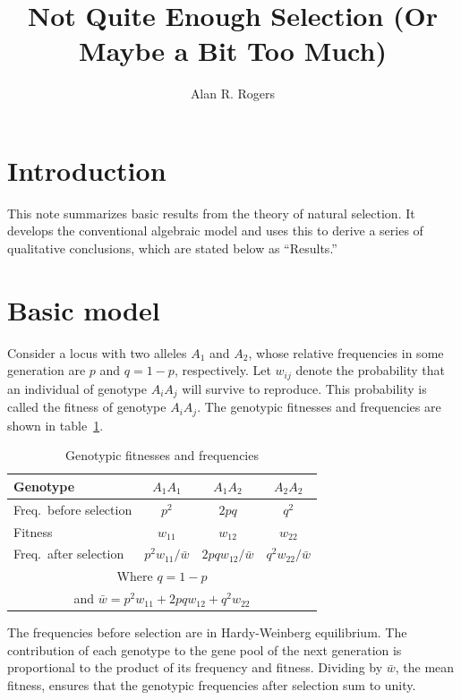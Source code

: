 \documentclass[11pt]{article}
\begin{document}
\title{Not Quite Enough Selection (Or Maybe a Bit Too Much)}
\author{Alan R. Rogers}
\maketitle

\section{Introduction}
This note summarizes basic results from the theory of natural
selection. It develops the conventional algebraic model and uses this
to derive a series of qualitative conclusions, which are stated below
as ``Results.''

\section{Basic model}
Consider a locus with two alleles $A_1$ and $A_2$, whose relative
frequencies in some generation are $p$ and $q = 1 - p$,
respectively.  Let $w_{ij}$ denote the probability that an individual
of genotype $A_{i}A_{j}$ will survive to reproduce.  This probability
is called the fitness of genotype $A_{i}A_{j}$.  The genotypic
fitnesses and frequencies are shown in table~\ref{tab.fitness}.
\begin{table}
\caption{Genotypic fitnesses and frequencies\label{tab.fitness}}
\begin{center}
\begin{tabular}{lccc}
Genotype & $A_1A_1$ & $A_1A_2$ & $A_2A_2$\\ 
\hline\hline
Freq.\ before selection  & $p^{2}$ & $2pq$ & $q^{2}$\\
Fitness  & $w_{11}$ & $w_{12}$ & $w_{22}$ \\
Freq.\ after selection  & $p^{2}w_{11}/\bar w$
         & $2pq w_{12}/\bar w$
         & $q^{2}w_{22}/\bar w$\\ \hline
\multicolumn{4}{c}{Where $q = 1-p$}\\
\multicolumn{4}{c}{and $\bar w = p^{2}w_{11}+2pqw_{12}+q^{2}w_{22}$}\\
\end{tabular}
\end{center}
\end{table}%
The frequencies before selection are in Hardy-Weinberg equilibrium.
The contribution of each genotype to the gene pool of the next
generation is proportional to the product of its frequency and
fitness.  Dividing by $\bar w$, the mean fitness, ensures that the
genotypic frequencies after selection sum to unity.
\end{document}
